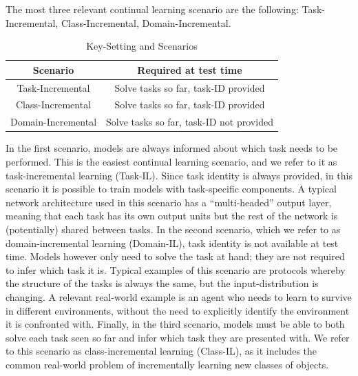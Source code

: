 \documentclass[english, LaM, oneside]{sapthesis}%
\begin{document}
The most three relevant continual learning scenario are the following: Task-Incremental, Class-Incremental, Domain-Incremental.
\begin{table}[h]
            \centering
            \begin{tabular}{ c|c  }
                \hline
                \textbf{Scenario} & \textbf{Required at test time}\\
                \hline \hline
                Task-Incremental & Solve tasks so far, task-ID provided\\
                \hline
                Class-Incremental & Solve tasks so far, task-ID provided\\
                \hline 
                Domain-Incremental & Solve tasks so far, task-ID not provided\\
               
                
                
                \hline 
                
            \end{tabular}
            
            \caption{Key-Setting and Scenarios}
            \label{tab:vggrob}
        \end{table}
In the first scenario, models are always informed about which task needs to be performed. This is the easiest continual learning scenario, and we refer to it as task-incremental learning (Task-IL). Since task identity is always provided, in this scenario it is possible to train models with task-specific components. A typical network architecture used in this scenario has a “multi-headed” output layer, meaning that each task has its own output units but the rest of the network is (potentially) shared between tasks.
In the second scenario, which we refer to as domain-incremental learning (Domain-IL), task identity is not available at test time. Models however only need to solve the task at hand; they are not required to infer which task it is. Typical examples of this scenario are protocols whereby the structure of the tasks is always the same, but the input-distribution is changing. A relevant real-world example is an agent who needs to learn to survive in different environments, without the need to explicitly identify the environment it is confronted with.
Finally, in the third scenario, models must be able to both solve each task seen so far and infer which task they are presented with. We refer to this scenario as class-incremental learning (Class-IL), as it includes the common real-world problem of incrementally learning new classes of objects.
\end{document}
